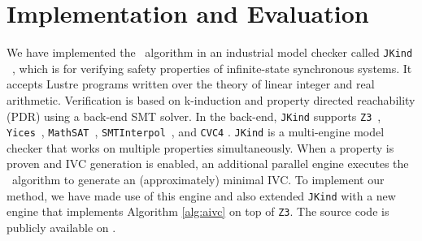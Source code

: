 \section{Implementation and Evaluation}
\label{sec:impl}

We have implemented the \aivcalg ~algorithm
in an industrial model checker called \texttt{JKind} ~\cite{jkind},
which is for verifying safety properties of  infinite-state synchronous systems.
It accepts Lustre programs \cite{Halbwachs91:lustre}
written over the theory of linear integer and real arithmetic.
Verification is based on k-induction and property directed reachability (PDR) using a back-end SMT solver.
In the
back-end, \texttt{JKind} supports \texttt{Z3}~\cite{DeMoura08:z3},
\texttt{Yices}~\cite{Dutertre06:yices}, \texttt{MathSAT}~\cite{Cimatti2013:MathSAT},
\texttt{SMTInterpol}~\cite{Christ2012:SMTInterpol}, and \texttt{CVC4} \cite{barrett2011cvc4}. \texttt{JKind} is a multi-engine model checker that works on multiple properties simultaneously. When a property is
proven and IVC generation is enabled, an additional parallel engine
executes the \ucalg ~algorithm \cite{Ghass16} to generate an (approximately) minimal IVC. To implement our method, we have made use of this engine and also extended \texttt{JKind} with a new engine that
implements Algorithm \ref{alg:aivc} on top of \texttt{Z3}.
The source code is publicly available on \cite{mygit}.



%

 